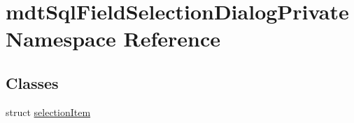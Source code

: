 \hypertarget{namespacemdt_sql_field_selection_dialog_private}{\section{mdt\-Sql\-Field\-Selection\-Dialog\-Private Namespace Reference}
\label{namespacemdt_sql_field_selection_dialog_private}
}
\subsection*{Classes}
\begin{DoxyCompactItemize}
\item 
struct \hyperlink{structmdt_sql_field_selection_dialog_private_1_1selection_item}{selection\-Item}
\end{DoxyCompactItemize}
